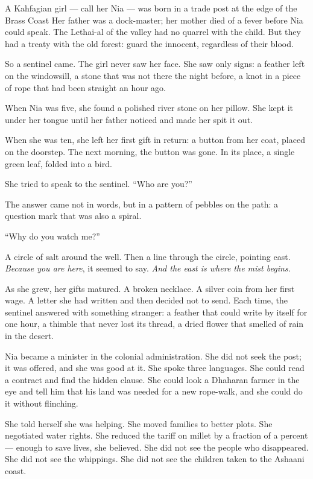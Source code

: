 \documentclass[10pt,twoside]{book}
\begin{document}
A Kahfagian girl --- call her Nia --- was born in a trade post at the edge of the Brass Coast Her father was a dock-master; her mother died of a fever before Nia could speak. The Lethai-al of the valley had no quarrel with the child. But they had a treaty with the old forest: guard the innocent, regardless of their blood.

So a sentinel came. The girl never saw her face. She saw only signs: a feather left on the windowsill, a stone that was not there the night before, a knot in a piece of rope that had been straight an hour ago.

When Nia was five, she found a polished river stone on her pillow. She kept it under her tongue until her father noticed and made her spit it out.

When she was ten, she left her first gift in return: a button from her coat, placed on the doorstep. The next morning, the button was gone. In its place, a single green leaf, folded into a bird.

She tried to speak to the sentinel. ``Who are you?''

The answer came not in words, but in a pattern of pebbles on the path: a question mark that was also a spiral.

``Why do you watch me?''

A circle of salt around the well. Then a line through the circle, pointing east. \textit{Because you are here}, it seemed to say. \textit{And the east is where the mist begins.}

As she grew, her gifts matured. A broken necklace. A silver coin from her first wage. A letter she had written and then decided not to send. Each time, the sentinel answered with something stranger: a feather that could write by itself for one hour, a thimble that never lost its thread, a dried flower that smelled of rain in the desert.

Nia became a minister in the colonial administration. She did not seek the post; it was offered, and she was good at it. She spoke three languages. She could read a contract and find the hidden clause. She could look a Dhaharan farmer in the eye and tell him that his land was needed for a new rope-walk, and she could do it without flinching.

She told herself she was helping. She moved families to better plots. She negotiated water rights. She reduced the tariff on millet by a fraction of a percent --- enough to save lives, she believed. She did not see the people who disappeared. She did not see the whippings. She did not see the children taken to the Ashaani coast.
\end{document}
